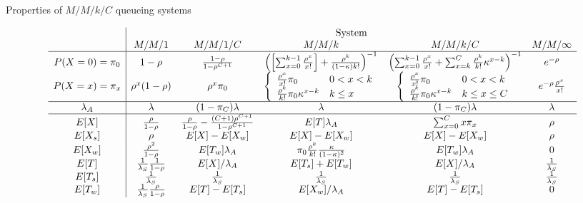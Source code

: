 \documentclass{article}
\newcommand{\utilization}{\rho}
\begin{document}
{\renewcommand{\arraystretch}{1.5}
\begin{sidewaystable}
\caption{Properties of $M/M/k/C$ queueing systems}
\label{tab:properties}
\[ \begin{array}{c|ccccc}
& \multicolumn{5}{c}{\mbox{System}} \\
 & M/M/1 & M/M/1/C & M/M/k & M/M/k/C & M/M/\infty \\
\hline
P(X=0)=\pi_0 & 1-\utilization & \frac{1-\utilization}{1-\utilization^{C+1}} & 
\left(\left[\sum_{x=0}^{k-1} \frac{\utilization^x}{x!}\right] + \frac{\utilization^k}{(1-\kappa)k!}\right)^{-1} &
\left(\sum_{x=0}^{k-1} \frac{\utilization^x}{x!} + \sum_{x=k}^C \frac{\utilization^k}{k!}\kappa^{x-k} \right)^{-1} 
& e^{-\utilization} \\
P(X=x)=\pi_x & \utilization^x (1-\utilization) & \utilization^x \pi_0 & \left\{ \begin{array}{ll} \frac{\utilization^x}{x!}\pi_0 & 0<x< k \\ \frac{\utilization^k}{k!}\pi_0 \kappa^{x-k} & k\le x \end{array} \right. 
& \left\{ \begin{array}{ll} \frac{\utilization^x}{x!}\pi_0 & 0<x< k \\ \frac{\utilization^k}{k!} \pi_0\kappa ^{x-k} & k\le x\le C \end{array} \right.   & e^{-\utilization} \frac{\utilization^x}{x!} \\
\hline
\lambda_A & \lambda & (1-\pi_C)\lambda & \lambda & (1-\pi_C)\lambda & \lambda \\
\hline
E[X] & \frac{\utilization}{1-\utilization} & \frac{\utilization}{1-\utilization} - \frac{(C+1)\utilization^{C+1}}{1-\utilization^{C+1}} & E[T]\lambda_A & \sum_{x=0}^C x \pi_x & \utilization \\
E[X_s] & \utilization & E[X]-E[X_w] & E[X]-E[X_w] & E[X]-E[X_w] & \utilization \\
E[X_w] & \frac{\utilization^2}{1-\utilization} & E[T_w] \lambda_A & \pi_0 \frac{\utilization^k}{k!} \frac{\kappa}{(1-\kappa)^2} & E[T_w] \lambda_A& 0 \\
E[T] & \frac{1}{\lambda_S}\frac{1}{1-\utilization} & E[X]/\lambda_A & E[T_s]+E[T_w] & E[X]/\lambda_A & \frac{1}{\lambda_S} \\
E[T_s] & \frac{1}{\lambda_S} & \frac{1}{\lambda_S} & \frac{1}{\lambda_S} & \frac{1}{\lambda_S} & \frac{1}{\lambda_S} \\
E[T_w] & \frac{1}{\lambda_S}\frac{\utilization}{1-\utilization} & E[T]-E[T_s] & E[X_w] / \lambda_A  & E[T]-E[T_s]& 0 \\
\end{array} \]
\end{sidewaystable}
}
\end{document}
